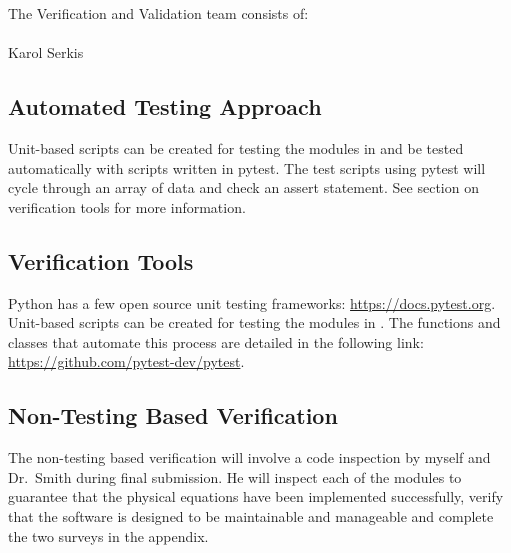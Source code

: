 \documentclass[12pt, titlepage]{article}
\begin{document}
The Verification and Validation team consists of:\\\\
Karol Serkis

\subsection{Automated Testing Approach}

Unit-based scripts can be created for testing the modules in \progname{}and be tested automatically with 
scripts written in pytest. The test scripts using pytest will cycle through an array of data and check an assert 
statement. See section on verification tools for more information.

\subsection{Verification Tools}

Python has a few open source unit testing frameworks: \url{https://docs.pytest.org}. \\
Unit-based scripts can be created for testing the modules in \progname. The functions and classes that automate 
this process are detailed in the following link: 
\url{https://github.com/pytest-dev/pytest}.\\

		

\subsection{Non-Testing Based Verification}

The non-testing based verification will involve a code inspection by myself and
Dr.\ Smith during final submission. He will inspect each of the modules to
guarantee that the 
physical equations have been implemented successfully, verify that the software 
is designed to be maintainable and manageable and complete the 
two surveys in the appendix.\\
\end{document}
